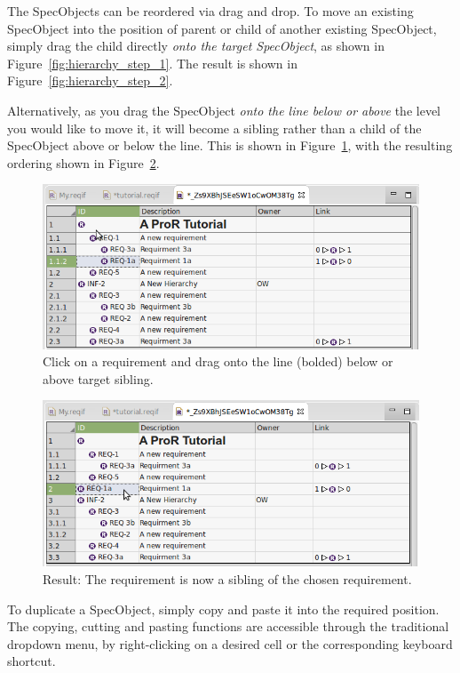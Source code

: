 The SpecObjects can be reordered via drag and drop.  To move an existing SpecObject into the position of parent or child of another existing SpecObject, simply drag the child directly \textit{onto the target SpecObject}, as shown in Figure~\ref{fig:hierarchy_step_1}. The result is shown in Figure~\ref{fig:hierarchy_step_2}. 

Alternatively, as you drag the SpecObject \textit{onto the line below or above} the level you would like to move it, it will become a sibling rather than a child of the SpecObject above or below the line.  This is shown in Figure~\ref{fig:hierarchy_step_3}, with the resulting ordering shown in Figure~\ref{fig:hierarchy_step_4}.

\begin{figure}
  \centering
  \includegraphics[width=0.8\linewidth]{../rmf-images/hierarchy_step_3.png}
  \caption{Click on a requirement and drag onto the line (bolded) below or above target sibling.}
  \label{fig:hierarchy_step_3}
\end{figure}
\begin{figure}
  \centering
  \includegraphics[width=0.8\linewidth]{../rmf-images/hierarchy_step_4.png}
  \caption{Result: The requirement is now a sibling of the chosen requirement.}
  \label{fig:hierarchy_step_4}
\end{figure}

To duplicate a SpecObject, simply copy and paste it into the required position. The copying, cutting and pasting functions are accessible through the traditional dropdown menu, by right-clicking on a desired cell or the corresponding keyboard shortcut.

